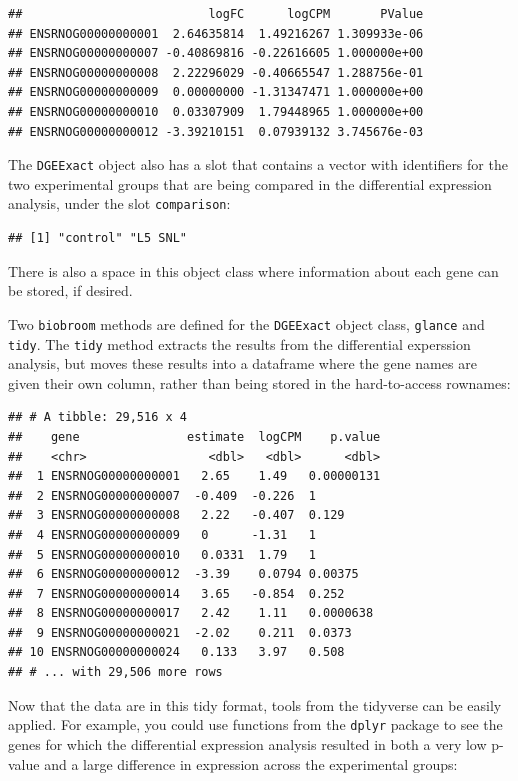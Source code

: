 \documentclass[]{tufte-book}
\begin{document}
\begin{verbatim}
##                          logFC      logCPM       PValue
## ENSRNOG00000000001  2.64635814  1.49216267 1.309933e-06
## ENSRNOG00000000007 -0.40869816 -0.22616605 1.000000e+00
## ENSRNOG00000000008  2.22296029 -0.40665547 1.288756e-01
## ENSRNOG00000000009  0.00000000 -1.31347471 1.000000e+00
## ENSRNOG00000000010  0.03307909  1.79448965 1.000000e+00
## ENSRNOG00000000012 -3.39210151  0.07939132 3.745676e-03
\end{verbatim}

The \texttt{DGEExact} object also has a slot that contains a vector with identifiers
for the two experimental groups that are being compared in the
differential expression analysis, under the slot \texttt{comparison}:

\begin{verbatim}
## [1] "control" "L5 SNL"
\end{verbatim}

There is also a space in this object class where information about each
gene can be stored, if desired.

Two \texttt{biobroom} methods are defined for the \texttt{DGEExact} object class, \texttt{glance}
and \texttt{tidy}. The \texttt{tidy} method extracts the results from the differential
experssion analysis, but moves these results into a dataframe where the
gene names are given their own column, rather than being stored in the
hard-to-access rownames:

\begin{verbatim}
## # A tibble: 29,516 x 4
##    gene               estimate  logCPM    p.value
##    <chr>                 <dbl>   <dbl>      <dbl>
##  1 ENSRNOG00000000001   2.65    1.49   0.00000131
##  2 ENSRNOG00000000007  -0.409  -0.226  1         
##  3 ENSRNOG00000000008   2.22   -0.407  0.129     
##  4 ENSRNOG00000000009   0      -1.31   1         
##  5 ENSRNOG00000000010   0.0331  1.79   1         
##  6 ENSRNOG00000000012  -3.39    0.0794 0.00375   
##  7 ENSRNOG00000000014   3.65   -0.854  0.252     
##  8 ENSRNOG00000000017   2.42    1.11   0.0000638 
##  9 ENSRNOG00000000021  -2.02    0.211  0.0373    
## 10 ENSRNOG00000000024   0.133   3.97   0.508     
## # ... with 29,506 more rows
\end{verbatim}

Now that the data are in this tidy format, tools from the tidyverse can
be easily applied. For example, you could use functions from the \texttt{dplyr}
package to see the genes for which the differential expression analysis
resulted in both a very low p-value and a large difference in expression
across the experimental groups:
\end{document}
